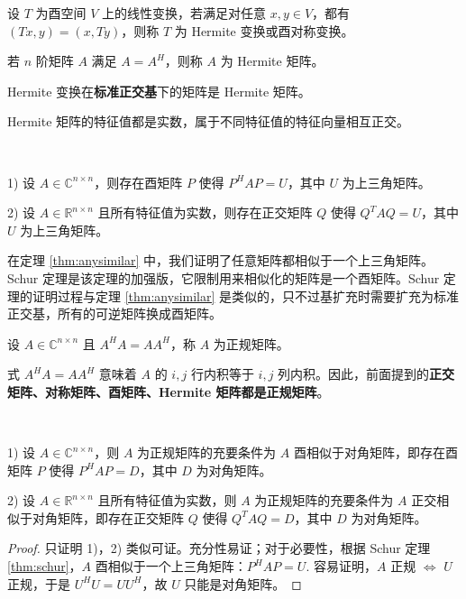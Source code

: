 \begin{definition}
设 $T$ 为酉空间 $V$ 上的线性变换，若满足对任意 $x,y\in V$，都有 $(Tx,y)=(x,Ty)$，则称 $T$ 为 Hermite 变换或酉对称变换。
\end{definition}

\begin{definition}[Hermite 矩阵]
若 $n$ 阶矩阵 $A$ 满足 $A=A^H$，则称 $A$ 为 Hermite 矩阵。
\end{definition}

\begin{theorem}
Hermite 变换在\textbf{标准正交基}下的矩阵是 Hermite 矩阵。
\end{theorem}

\begin{theorem}
Hermite 矩阵的特征值都是实数，属于不同特征值的特征向量相互正交。
\end{theorem}

\begin{theorem}[Schur 定理]
\label{thm:schur}
\ 

1) 设 $A\in\mathbb C^{n\times n}$，则存在酉矩阵 $P$ 使得 $P^HAP=U$，其中 $U$ 为上三角矩阵。

2) 设 $A\in\mathbb R^{n\times n}$ 且所有特征值为实数，则存在正交矩阵 $Q$ 使得 $Q^TAQ=U$，其中 $U$ 为上三角矩阵。
\end{theorem}

\begin{remark}
在定理 \ref{thm:anysimilar} 中，我们证明了任意矩阵都相似于一个上三角矩阵。Schur 定理是该定理的加强版，它限制用来相似化的矩阵是一个酉矩阵。Schur 定理的证明过程与定理 \ref{thm:anysimilar} 是类似的，只不过基扩充时需要扩充为标准正交基，所有的可逆矩阵换成酉矩阵。
\end{remark}

\begin{definition}[正规矩阵]
设 $A\in\mathbb C^{n\times n}$ 且 $A^HA=AA^H$，称 $A$ 为正规矩阵。
\end{definition}
\begin{remark}
式 $A^HA=AA^H$ 意味着 $A$ 的 $i,j$ 行内积等于 $i,j$ 列内积。因此，前面提到的\textbf{正交矩阵、对称矩阵、酉矩阵、Hermite 矩阵都是正规矩阵}。
\end{remark}

\begin{theorem}[正规矩阵的充要条件]
\label{thm:unisim}
\ 

1) 设 $A\in\mathbb C^{n\times n}$，则 $A$ 为正规矩阵的充要条件为 $A$ 酉相似于对角矩阵，即存在酉矩阵 $P$ 使得 $P^HAP=D$，其中 $D$ 为对角矩阵。

2) 设 $A\in\mathbb R^{n\times n}$ 且所有特征值为实数，则 $A$ 为正规矩阵的充要条件为 $A$ 正交相似于对角矩阵，即存在正交矩阵 $Q$ 使得 $Q^TAQ=D$，其中 $D$ 为对角矩阵。
\end{theorem}
\begin{proof}
只证明 1)，2) 类似可证。充分性易证；对于必要性，根据 Schur 定理 \ref{thm:schur}，$A$ 酉相似于一个上三角矩阵：$P^HAP=U$. 容易证明，$A$ 正规 $\iff$ $U$ 正规，于是 $U^HU=UU^H$，故 $U$ 只能是对角矩阵。
\end{proof}


